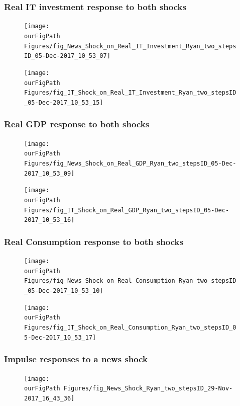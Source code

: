 \documentclass{beamer}
\def \ourFigPath {../../}
\begin{document}
\begin{frame}
\frametitle{Real IT investment response to both shocks}
\begin{figure}
	\centering
	\texttt{[image: \\ourFigPath Figures/fig\_News\_Shock\_on\_Real\_IT\_Investment\_Ryan\_two\_stepsID\_05-Dec-2017\_10\_53\_07]}
\end{figure}
\begin{figure}
	\centering
	\texttt{[image: \\ourFigPath Figures/fig\_IT\_Shock\_on\_Real\_IT\_Investment\_Ryan\_two\_stepsID\_05-Dec-2017\_10\_53\_15]}
\end{figure}
\end{frame}

\begin{frame}
\frametitle{Real GDP response to both shocks}
\begin{figure}
	\centering
	\texttt{[image: \\ourFigPath Figures/fig\_News\_Shock\_on\_Real\_GDP\_Ryan\_two\_stepsID\_05-Dec-2017\_10\_53\_09]}
\end{figure}
\begin{figure}
	\centering
	\texttt{[image: \\ourFigPath Figures/fig\_IT\_Shock\_on\_Real\_GDP\_Ryan\_two\_stepsID\_05-Dec-2017\_10\_53\_16]}
\end{figure}
\end{frame}

\begin{frame}
\frametitle{Real Consumption response to both shocks}
\begin{figure}
	\centering
	\texttt{[image: \\ourFigPath Figures/fig\_News\_Shock\_on\_Real\_Consumption\_Ryan\_two\_stepsID\_05-Dec-2017\_10\_53\_10]}
\end{figure}
\begin{figure}
	\centering
	\texttt{[image: \\ourFigPath Figures/fig\_IT\_Shock\_on\_Real\_Consumption\_Ryan\_two\_stepsID\_05-Dec-2017\_10\_53\_17]}
\end{figure}
\end{frame}




\begin{frame}
	\frametitle{Impulse responses to a news shock}

\vspace{-1cm}
\noindent
\begin{figure}
\centering
\texttt{[image: \\ourFigPath Figures/fig\_News\_Shock\_Ryan\_two\_stepsID\_29-Nov-2017\_16\_43\_36]}
\end{figure}	
	
\end{frame}
\end{document}
